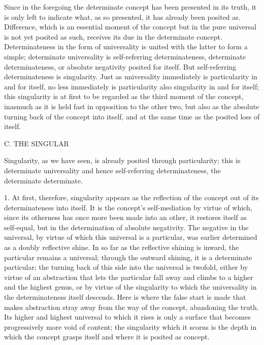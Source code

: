 Since in the foregoing the determinate concept
has been presented in its truth,
it is only left to indicate what, as so presented,
it has already been posited as.
Difference, which is an essential moment of the concept
but in the pure universal is not yet posited as such,
receives its due in the determinate concept.
Determinateness in the form of universality is
united with the latter to form a simple;
determinate universality is self-referring determinateness,
determinate determinateness,
or absolute negativity posited for itself.
But self-referring determinateness is singularity.
Just as universality immediately is
particularity in and for itself,
no less immediately is particularity also
singularity in and for itself;
this singularity is at first to be regarded as
the third moment of the concept,
inasmuch as it is held fast
in opposition to the other two,
but also as the absolute turning back
of the concept into itself,
and at the same time
as the posited loss of itself.

C. THE SINGULAR

Singularity, as we have seen, is
already posited through particularity;
this is determinate universality
and hence self-referring determinateness,
the determinate determinate.

1. At first, therefore, singularity appears
as the reflection of the concept
out of its determinateness into itself.
It is the concept's self-mediation by virtue of which,
since its otherness has once more been made into an other,
it restores itself as self-equal,
but in the determination of absolute negativity.
The negative in the universal,
by virtue of which this universal is a particular,
was earlier determined as a doubly reflective shine.
In so far as the reflective shining is inward,
the particular remains a universal;
through the outward shining,
it is a determinate particular;
the turning back of this side
into the universal is twofold,
either by virtue of an abstraction
that lets the particular fall away
and climbs to a higher and the highest genus,
or by virtue of the singularity
to which the universality in
the determinateness itself descends.
Here is where the false start is made
that makes abstraction stray away
from the way of the concept,
abandoning the truth.
Its higher and highest universal
to which it rises is  only a surface
that becomes progressively more void of content;
the singularity which it scorns is
the depth in which the concept grasps itself
and where it is posited as concept.

